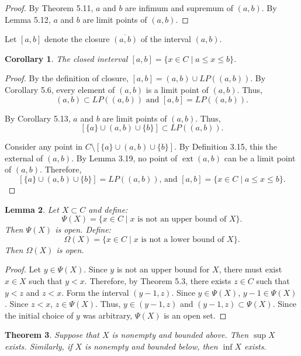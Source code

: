 \documentclass{amsart}
\newtheorem{theorem}{Theorem}
\newtheorem{lemma}[theorem]{Lemma}
\newtheorem{corollary}[theorem]{Corollary}
\newcommand{\1}{\mathds{1}}
\DeclareMathOperator{\ext}{ext}
\numberwithin{equation}{section}
\numberwithin{theorem}{section}
\begin{document}
\begin{proof}
	By Theorem 5.11, $a$ and $b$ are infimum and supremum of $(a,b)$. By Lemma 5.12, $a$ and $b$ are limit points of $(a,b)$.
\end{proof}

Let $[a, b]$ denote the closure $\overline{(a,b)}$ of the interval $(a,b)$.  

\begin{corollary}
The closed ineterval $[a, b] = \{x \in C \mid a \leq x \leq b  \}$.
\end{corollary}

\begin{proof}
	By the definition of closure, $[a, b] = (a,b) \cup LP((a,b))$. By Corollary 5.6, every element of $(a,b)$ is a limit point of $(a,b)$. Thus, 
	$$(a,b) \subset LP((a,b)) \text{ and } [a, b] = LP((a,b)).$$
	
	By Corollary 5.13, $a$ and $b$ are limit points of $(a,b)$. Thus, $$\left[\{a\} \cup (a,b) \cup \{b\} \right] \subset LP((a,b)).$$
	
	Consider any point in $C\setminus \left[ \{a\} \cup (a,b) \cup \{b\} \right]$. By Definition 3.15, this the external of $(a,b)$. By Lemma 3.19, no point of $\ext(a,b)$ can be a limit point of $(a,b)$. Therefore, $$\left[ \{a\} \cup (a,b) \cup \{b\} \right] = LP((a,b)) \text{, and } [a, b] = \{x \in C \mid a \leq x \leq b  \}.$$
\end{proof}

\begin{lemma}  Let $X \subset C$ and define:
\[
\Psi(X) = \{ x \in C \mid \text{$x$ is not an upper bound of $X$} \}.
\]
Then $\Psi(X)$ is open.
Define:
\[
\Omega(X) = \{ x \in C \mid \text{$x$ is not a lower bound of $X$} \}.
\]
Then $\Omega(X)$ is open.
\end{lemma}

\begin{proof}
	Let $y\in \Psi(X)$. Since $y$ is not an upper bound for $X$, there must exist $x\in X$ such that $y<x$. Therefore, by Theorem 5.3, there exists $z\in C$ such that $y<z$ and $z<x$. Form the interval $(y-1,z)$. Since $y\in \Psi(X)$, $y-1\in \Psi(X)$. Since $z<x$, $z\in \Psi(X)$. Thus, $y\in (y-1,z)$ and $(y-1,z)\subset \Psi(X)$. Since the initial choice of $y$ was arbitrary, $\Psi(X)$ is an open set.   
\end{proof}

\begin{theorem}  Suppose that $X$ is nonempty and bounded above. Then $\sup X$ exists. Similarly, if $X$ is nonempty and bounded below, then $\inf X$ exists.
\end{theorem}
\end{document}
